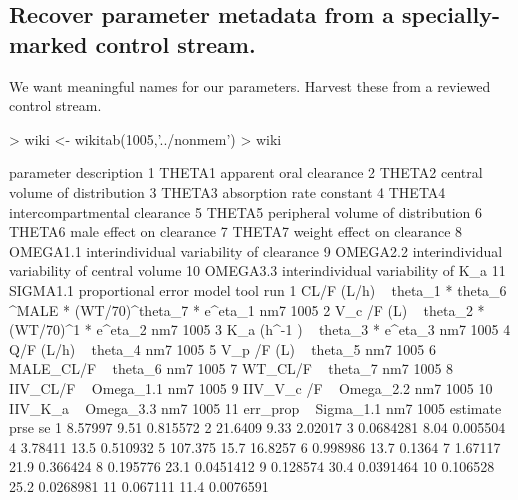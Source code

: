 \subsection{Recover parameter metadata from a specially-marked control stream.}
We want meaningful names for our parameters.  Harvest these from a reviewed control
stream.
\begin{Schunk}
\begin{Sinput}
> wiki <- wikitab(1005,'../nonmem')
> wiki
\end{Sinput}
\begin{Soutput}
   parameter                                   description
1     THETA1                       apparent oral clearance
2     THETA2                central volume of distribution
3     THETA3                      absorption rate constant
4     THETA4                  intercompartmental clearance
5     THETA5             peripheral volume of distribution
6     THETA6                      male effect on clearance
7     THETA7                    weight effect on clearance
8   OMEGA1.1      interindividual variability of clearance
9   OMEGA2.2 interindividual variability of central volume
10  OMEGA3.3            interindividual variability of K_a
11  SIGMA1.1                            proportional error
                                                                model tool  run
1  CL/F (L/h) ~ theta_1 *  theta_6 ^MALE * (WT/70)^theta_7  * e^eta_1  nm7 1005
2                          V_c /F (L) ~ theta_2 * (WT/70)^1 * e^eta_2  nm7 1005
3                                     K_a (h^-1 ) ~ theta_3 * e^eta_3  nm7 1005
4                                                 Q/F (L/h) ~ theta_4  nm7 1005
5                                                V_p /F (L) ~ theta_5  nm7 1005
6                                                 MALE_CL/F ~ theta_6  nm7 1005
7                                                   WT_CL/F ~ theta_7  nm7 1005
8                                                IIV_CL/F ~ Omega_1.1  nm7 1005
9                                              IIV_V_c /F ~ Omega_2.2  nm7 1005
10                                               IIV_K_a  ~ Omega_3.3  nm7 1005
11                                               err_prop ~ Sigma_1.1  nm7 1005
    estimate prse        se
1    8.57997 9.51  0.815572
2    21.6409 9.33   2.02017
3  0.0684281 8.04  0.005504
4    3.78411 13.5  0.510932
5    107.375 15.7   16.8257
6   0.998986 13.7    0.1364
7    1.67117 21.9  0.366424
8   0.195776 23.1 0.0451412
9   0.128574 30.4 0.0391464
10  0.106528 25.2 0.0268981
11  0.067111 11.4 0.0076591
\end{Soutput}

\end{Schunk}
